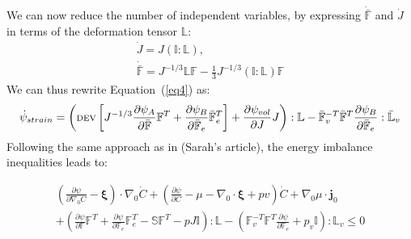 \documentclass[12pt]{extarticle}
\newcommand{\F}{\ensuremath{\mathbb{F}}}
\newcommand{\LL}{\ensuremath{\mathbb{L}}}
\begin{document}
We can now reduce the number of independent variables, by expressing $\dot{\bar{\F}}$ and $\dot{J}$ in terms of the deformation tensor $\LL$:
\begin{gather}
\dot{J} = J (\mathbb{I}:\LL),\\
\dot{\bar{\F}} = J^{-1/3} \LL \F - \frac{1}{3} J^{-1/3} (\mathbb{I}:\LL) \F 
\end{gather}
We can thus rewrite Equation~(\ref{eq4}) as:
\begin{equation}
\scriptsize
\dot{\psi}_{strain} = \left( \text{DEV} \left[J^{-1/3}\frac{\partial \psi_A}{\partial \bar{\F}}\F^T+ \frac{\partial \psi_B}{\partial \bar{\F}_e}\bar{\F}_e^{T}\right]+\frac{\partial \psi_{vol}}{\partial J} J\right) : \LL -\bar{\F}_v^{-T}\bar{\F}^T\frac{\partial \psi_B}{\partial \bar{\F}_e}:\bar{\LL}_v
\end{equation}
Following the same approach as in (Sarah's article), the energy imbalance inequalities leads to:

\begin{equation}
\begin{aligned}
\left(\frac{\partial \psi}{\partial \nabla_0 C}-\boldsymbol{\xi}\right)\cdot \nabla_0 \dot{C} + \left(\frac{\partial \psi}{\partial C}-\mu-\nabla_0\cdot\boldsymbol{\xi}+ p v\right) \dot{C}+ \nabla_0 \mu \cdot \mathbf{j}_0 \\
+\left(\frac{\partial \psi}{\partial \F}\F^T + \frac{\partial \psi}{\partial \F_e}\F_e^{T}- \mathbb{S}\F^T - p J \mathbb{I}\right):\LL- \left(\F_v^{-T}\F^T \frac{\partial \psi}{\partial \F_e}+p_v  \mathbb{I}\right):\LL_v \leq 0
\end{aligned}
\label{dis}
\end{equation}
\end{document}
